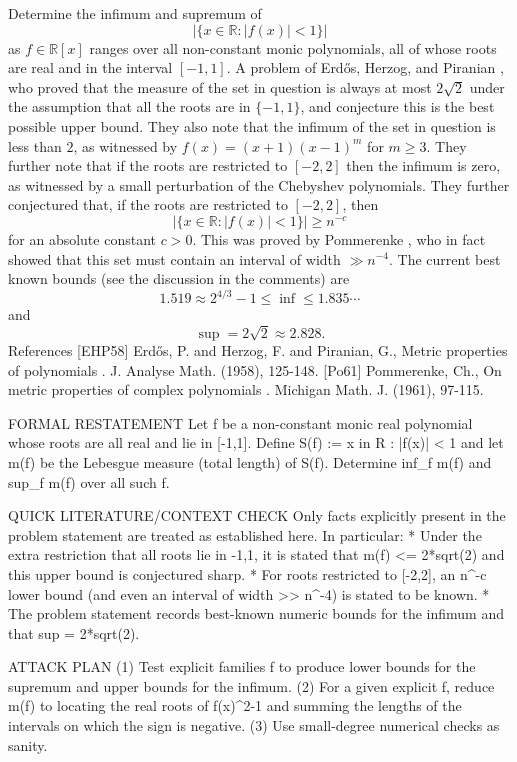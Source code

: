 Determine the infimum and supremum of\[\lvert \{ x\in \mathbb{R} : \lvert f(x)\rvert < 1\}\rvert\]as $f\in \mathbb{R}[x]$ ranges over all non-constant monic polynomials, all of whose roots are real and in the interval $[-1,1]$. A problem of Erd\H{o}s, Herzog, and Piranian \cite{EHP58}, who proved that the measure of the set in question is always at most $2\sqrt{2}$ under the assumption that all the roots are in $\{-1,1\}$, and conjecture this is the best possible upper bound. They also note that the infimum of the set in question is less than $2$, as witnessed by $f(x)=(x+1)(x-1)^m$ for $m\geq 3$. They further note that if the roots are restricted to $[-2,2]$ then the infimum is zero, as witnessed by a small perturbation of the Chebyshev polynomials. They further conjectured that, if the roots are restricted to $[-2,2]$, then\[\lvert \{ x\in \mathbb{R} : \lvert f(x)\rvert < 1\}\rvert\geq n^{-c}\]for an absolute constant $c>0$. This was proved by Pommerenke \cite{Po61}, who in fact showed that this set must contain an interval of width $\gg n^{-4}$. The current best known bounds (see the discussion in the comments) are\[1.519\approx 2^{4/3}-1\leq \inf \leq 1.835\cdots\]and\[\sup = 2\sqrt{2}\approx 2.828.\] References [EHP58] Erd\H{o}s, P. and Herzog, F. and Piranian, G., Metric properties of polynomials . J. Analyse Math. (1958), 125-148. [Po61] Pommerenke, Ch., On metric properties of complex polynomials . Michigan Math. J. (1961), 97-115.



FORMAL RESTATEMENT
Let f be a non-constant monic real polynomial whose roots are all real and lie in [-1,1]. Define
  S(f) := { x in R : |f(x)| < 1 }
and let m(f) be the Lebesgue measure (total length) of S(f). Determine
  inf_f m(f)  and  sup_f m(f)
over all such f.

QUICK LITERATURE/CONTEXT CHECK
Only facts explicitly present in the problem statement are treated as established here. In particular:
* Under the extra restriction that all roots lie in {-1,1}, it is stated that m(f) <= 2*sqrt(2) and this upper bound is conjectured sharp.
* For roots restricted to [-2,2], an n^{-c} lower bound (and even an interval of width >> n^{-4}) is stated to be known.
* The problem statement records best-known numeric bounds for the infimum and that sup = 2*sqrt(2).

ATTACK PLAN
(1) Test explicit families f to produce lower bounds for the supremum and upper bounds for the infimum.
(2) For a given explicit f, reduce m(f) to locating the real roots of f(x)^2-1 and summing the lengths of the intervals on which the sign is negative.
(3) Use small-degree numerical checks as sanity.

